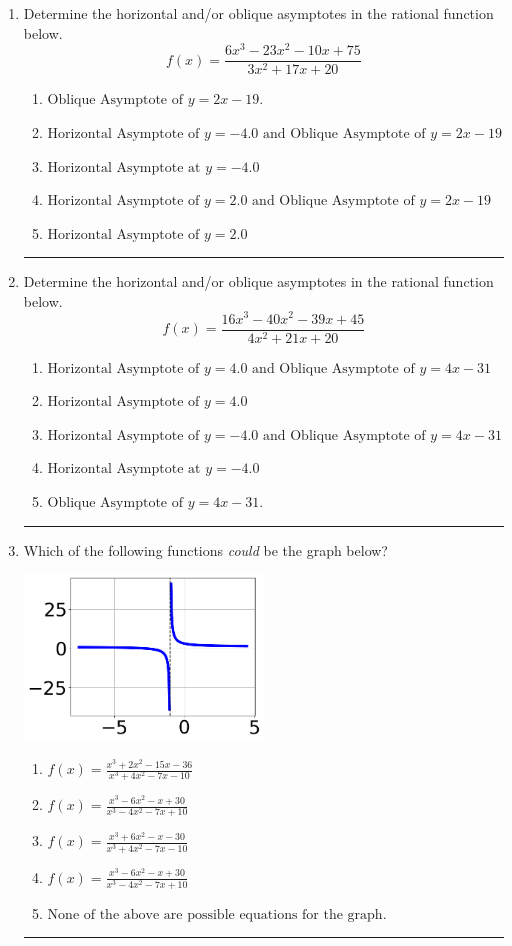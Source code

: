 \documentclass[14pt]{extbook}
\newcommand{\litem}[1]{\item#1\hspace*{-1cm}\rule{\textwidth}{0.4pt}}
\begin{document}
\begin{enumerate}
\litem{
Determine the horizontal and/or oblique asymptotes in the rational function below.\[ f(x) = \frac{6x^{3} -23 x^{2} -10 x + 75}{3x^{2} +17 x + 20} \]\begin{enumerate}[label=\Alph*.]
\item \( \text{Oblique Asymptote of } y = 2x -19. \)
\item \( \text{Horizontal Asymptote of } y = -4.0 \text{ and Oblique Asymptote of } y = 2x -19 \)
\item \( \text{Horizontal Asymptote at } y = -4.0 \)
\item \( \text{Horizontal Asymptote of } y = 2.0 \text{ and Oblique Asymptote of } y = 2x -19 \)
\item \( \text{Horizontal Asymptote of } y = 2.0  \)

\end{enumerate} }
\litem{
Determine the horizontal and/or oblique asymptotes in the rational function below.\[ f(x) = \frac{16x^{3} -40 x^{2} -39 x + 45}{4x^{2} +21 x + 20} \]\begin{enumerate}[label=\Alph*.]
\item \( \text{Horizontal Asymptote of } y = 4.0 \text{ and Oblique Asymptote of } y = 4x -31 \)
\item \( \text{Horizontal Asymptote of } y = 4.0  \)
\item \( \text{Horizontal Asymptote of } y = -4.0 \text{ and Oblique Asymptote of } y = 4x -31 \)
\item \( \text{Horizontal Asymptote at } y = -4.0 \)
\item \( \text{Oblique Asymptote of } y = 4x -31. \)

\end{enumerate} }
\litem{
Which of the following functions \textit{could} be the graph below?
\begin{center}
    \includegraphics[width=0.5\textwidth]{../Figures/identifyGraphOfRationalFunctionB.png}
\end{center}
\begin{enumerate}[label=\Alph*.]
\item \( f(x)=\frac{x^{3} +2 x^{2} -15 x -36}{x^{3} +4 x^{2} -7 x -10} \)
\item \( f(x)=\frac{x^{3} -6 x^{2} -x + 30}{x^{3} -4 x^{2} -7 x + 10} \)
\item \( f(x)=\frac{x^{3} +6 x^{2} -x -30}{x^{3} +4 x^{2} -7 x -10} \)
\item \( f(x)=\frac{x^{3} -6 x^{2} -x + 30}{x^{3} -4 x^{2} -7 x + 10} \)
\item \( \text{None of the above are possible equations for the graph.} \)


\end{enumerate}}
\end{enumerate}
\end{document}
